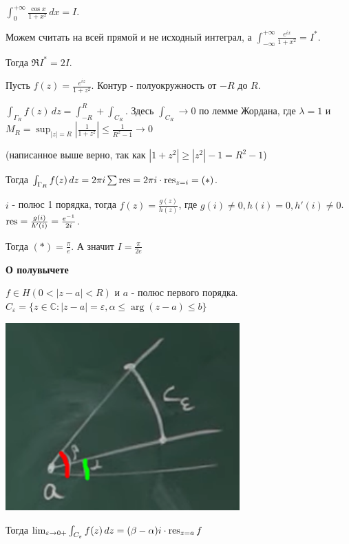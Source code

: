 \begin{example}
    $\int_0^{+\infty} \frac{\cos x}{1 + x^2} \, dx = I$.

    Можем считать на всей прямой и не исходный интеграл, а $\int_{-\infty}^{+\infty} \frac{e^{ix}}{1 + x^2} = I^*$.

    Тогда $\Re I^* = 2I$.

    Пусть $f(z) = \frac{e^{iz}}{1 + z^2}$. Контур - полуокружность от $-R$ до $R$.

    $\int_{\Gamma_R} f(z) \, dz = \int_{-R}^{R} + \int_{C_R}$. Здесь $\int_{C_R} \rightarrow 0$ по лемме
    Жордана, где $\lambda = 1$ и $M_R = \sup_{|z| = R} \left | \frac{1}{1 + z^2} \right | \leqslant \frac{1}{R^2 - 1} \rightarrow 0$

    (написанное выше верно, так как $|1 + z^2| \geqslant |z^2| - 1 = R^2 - 1$)

    Тогда $\int_{\Gamma_R} f(z) \, dz = 2 \pi i \sum \operatorname{res} = 2 \pi i \cdot \operatorname{res}_{z = i} = (*)$.

    $i$ - полюс 1 порядка, тогда $f(z) = \frac{g(z)}{h(z)}$, где $g(i) \neq 0, h(i) = 0, h'(i) \neq 0$. $
    \operatorname{res} = \frac{g(i)}{h'(i)} = \frac{e^{-1}}{2i}$.

    Тогда $(*) = \frac{\pi}{e}$. А значит $I = \frac{\pi}{2e}$

\end{example}

\begin{lemma}
    \textbf{О полувычете}

    $f \in H(0 < |z - a| < R)$ и $a$ - полюс первого порядка. $C_{\varepsilon} = \{ z \in \mathbb{C} : |z - a| = \varepsilon, \alpha \leqslant \arg (z - a) \leqslant b \}$

    \begin{center}
        \includegraphics[width=9cm]{assets/04-functions-of-complex-variables/lemma-about-half-deduction.png}
    \end{center}

    Тогда $\lim_{\varepsilon \to 0+} \int_{C_{\varepsilon}} f(z) \, dz = (\beta - \alpha) i \cdot \operatorname{res}_{z = a} f$
\end{lemma}

